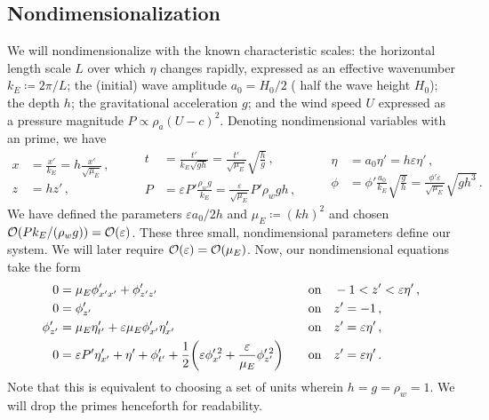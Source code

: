 \documentclass{jfm}
\renewcommand*{\epsilon}{\varepsilon}
\begin{document}
\subsection{\label{sec:nondim} Nondimensionalization}
We will nondimensionalize with the known characteristic scales: the
horizontal length scale $L$ over which $\eta$ changes
rapidly, expressed as an effective wavenumber $k_E \coloneqq 2 \pi/L$;
the (initial) wave amplitude $a_0 = H_0/2$ (\ie{} half the wave height
$H_0$); the depth $h$; the gravitational acceleration $g$; and the wind
speed $U$ expressed as a pressure magnitude $P \propto \rho_a (U-c)^2$.
Denoting nondimensional variables with an prime, we have
\begin{equation*}
  \begin{aligned}
  x &= \frac{x'}{k_E} = h \frac{x'}{\sqrt{\mu_E}}\,, \\
  z &= h z' \,,
  \end{aligned}
  \qquad
  \begin{aligned}
  t &= \frac{t'}{k_E\sqrt{g h}}
    = \frac{t'}{\sqrt{\mu_E}} \sqrt{\frac{h}{g}} \,, \\
  P &= \epsilon P' \frac{\rho_w g}{k_E}
    = \frac{\epsilon}{\sqrt{\mu_E}} P' \rho_w g h \,,
  \end{aligned}
  \qquad
  \begin{aligned}
  \eta &= a_0 \eta' = h \epsilon \eta' \,, \\
  \phi &= \phi'\frac{a_0}{k_E}\sqrt{\frac{g}{h}}
    = \frac{\phi'\epsilon}{\sqrt{\mu_E}}\sqrt{g h^3} \,.
  \end{aligned}
\end{equation*}
We have defined the parameters $\epsilon a_0/2h$ and $\mu_E \coloneqq
(kh)^2$ and chosen $\order{P k_E/(\rho_w g)} = \order{\epsilon}$.
These three small, nondimensional parameters define our system.
We will later require $\order{\epsilon} = \order{\mu_E}$.
Now, our nondimensional equations take the form
\begin{alignat}{2}
  0 &= \mu_E \phi'_{x'x'} + \phi'_{z'z'} &&\qq{on}
    -1 < z' < \epsilon \eta' \,, \label{eq:laplace_nondim} \\
  0 &= \phi'_{z'} &&\qq{on} z'=-1 \,, \label{eq:bottom_bc_nondim} \\
  \phi'_{z'} &= \mu_E \eta'_{t'} +
    \epsilon \mu_E \phi'_{x'} \eta'_{x'} &&\qq{on} z' = \epsilon \eta' \,,
    \label{eq:kinematic_bc_nondim} \\
  0 &= \epsilon P' \eta'_{x'} +  \eta' + \phi'_{t'} + \frac{1}{2}
    \pqty{\epsilon \phi_{x'}^{\prime \, 2} + \frac{\epsilon}{\mu_E}
    \phi_{z'}^{\prime \, 2}} &&\qq{on} z'= \epsilon \eta' \,.
    \label{eq:dynamic_bc_nondim}
\end{alignat}
Note that this is equivalent to choosing a set of units wherein $h = g =
\rho_w = 1$.
We will drop the primes henceforth for readability.
\end{document}
